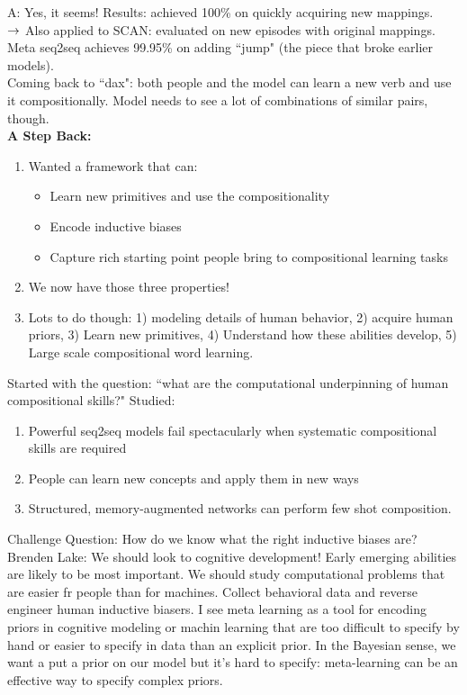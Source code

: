 A: Yes, it seems! Results: achieved 100\% on quickly acquiring new mappings. \\

$\rightarrow$ Also applied to SCAN: evaluated on new episodes with original mappings. Meta seq2seq achieves 99.95\% on adding ``jump" (the piece that broke earlier models). \\

Coming back to ``dax": both people and the model can learn a new verb and use it compositionally. Model needs to see a lot of combinations of similar pairs, though. \\

{\bf A Step Back:}
\begin{enumerate}
    \item Wanted a framework that can:
\begin{itemize}
\item Learn new primitives and use the compositionality
        \item Encode inductive biases
        \item Capture rich starting point people bring to compositional learning tasks
\end{itemize}
\item We now have those three properties!
\item Lots to do though: 1) modeling details of human behavior, 2) acquire human priors, 3) Learn new primitives, 4) Understand how these abilities develop, 5) Large scale compositional word learning.
\end{enumerate}

Started with the question: ``what are the computational underpinning of human compositional skills?" Studied:
\begin{enumerate}
    \item Powerful seq2seq models fail spectacularly when systematic compositional skills are required
    \item People can learn new concepts and apply them in new ways
    \item Structured, memory-augmented networks can perform few shot composition.
\end{enumerate}

Challenge Question: How do we know what the right inductive biases are? \\

Brenden Lake: We should look to cognitive development! Early emerging abilities are likely to be most important. We should study computational problems that are easier fr people than for machines. Collect behavioral data and reverse engineer human inductive biasers. I see meta learning as a tool for encoding priors in cognitive modeling or machin learning that are too difficult to specify by hand or easier to specify in data than an explicit prior. In the Bayesian sense, we want a put a prior on our model but it's hard to specify: meta-learning can be an effective way to specify complex priors. \\


